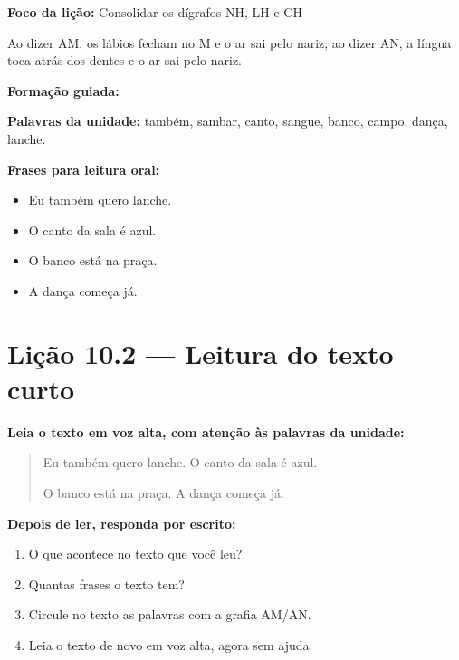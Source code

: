 \textbf{Foco da lição:} Consolidar os dígrafos NH, LH e CH


\begin{boquinha}
Ao dizer AM, os lábios fecham no M e o ar sai pelo nariz; ao dizer AN, a língua toca atrás dos dentes e o ar sai pelo nariz.
\end{boquinha}

\noindent\textbf{Formação guiada:}

\begin{center}
\end{center}

\noindent\textbf{Palavras da unidade:} também, sambar, canto, sangue, banco, campo, dança, lanche.

\noindent\textbf{Frases para leitura oral:}
\begin{itemize}[leftmargin=1.6em]
  \item Eu também quero lanche.
  \item O canto da sala é azul.
  \item O banco está na praça.
  \item A dança começa já.
\end{itemize}

\section{Lição 10.2 --- Leitura do texto curto}

\noindent\textbf{Leia o texto em voz alta, com atenção às palavras da unidade:}


\begin{quote}
Eu também quero lanche. O canto da sala é azul.

O banco está na praça. A dança começa já.
\end{quote}

\textbf{Depois de ler, responda por escrito:}
\begin{enumerate}

  \item O que acontece no texto que você leu?
  \begin{center}
  \underline{\hspace{12cm}}
  \end{center}

  \item Quantas frases o texto tem?
  \begin{center}
  \underline{\hspace{12cm}}
  \end{center}

  \item Circule no texto as palavras com a grafia AM/AN.

  \item Leia o texto de novo em voz alta, agora sem ajuda.

\end{enumerate}

